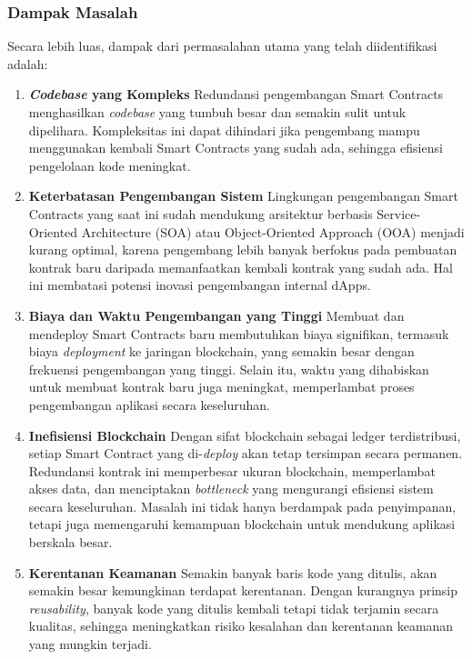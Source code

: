 \subsubsection{Dampak Masalah}
\label{subsubsec:dampak-masalah}

Secara lebih luas, dampak dari permasalahan utama yang telah diidentifikasi adalah:

\begin{enumerate}
	\item \textbf{\textit{Codebase} yang Kompleks} \newline
	      Redundansi pengembangan Smart Contracts menghasilkan \textit{codebase} yang tumbuh besar dan semakin sulit untuk dipelihara. Kompleksitas ini dapat dihindari jika pengembang mampu menggunakan kembali Smart Contracts yang sudah ada, sehingga efisiensi pengelolaan kode meningkat.
	\item \textbf{Keterbatasan Pengembangan Sistem} \newline
	      Lingkungan pengembangan Smart Contracts yang saat ini sudah mendukung arsitektur berbasis Service-Oriented Architecture (SOA) atau Object-Oriented Approach (OOA) menjadi kurang optimal, karena pengembang lebih banyak berfokus pada pembuatan kontrak baru daripada memanfaatkan kembali kontrak yang sudah ada. Hal ini membatasi potensi inovasi pengembangan internal dApps.
	\item \textbf{Biaya dan Waktu Pengembangan yang Tinggi} \newline
	      Membuat dan mendeploy Smart Contracts baru membutuhkan biaya signifikan, termasuk biaya \textit{deployment} ke jaringan blockchain, yang semakin besar dengan frekuensi pengembangan yang tinggi. Selain itu, waktu yang dihabiskan untuk membuat kontrak baru juga meningkat, memperlambat proses pengembangan aplikasi secara keseluruhan.
	\item \textbf{Inefisiensi Blockchain} \newline
	      Dengan sifat blockchain sebagai ledger terdistribusi, setiap Smart Contract yang di-\textit{deploy} akan tetap tersimpan secara permanen. Redundansi kontrak ini memperbesar ukuran blockchain, memperlambat akses data, dan menciptakan \textit{bottleneck} yang mengurangi efisiensi sistem secara keseluruhan. Masalah ini tidak hanya berdampak pada penyimpanan, tetapi juga memengaruhi kemampuan blockchain untuk mendukung aplikasi berskala besar.
	\item \textbf{Kerentanan Keamanan} \newline
	      Semakin banyak baris kode yang ditulis, akan semakin besar kemungkinan terdapat kerentanan. Dengan kurangnya prinsip \textit{reusability}, banyak kode yang ditulis kembali tetapi tidak terjamin secara kualitas, sehingga meningkatkan risiko kesalahan dan kerentanan keamanan yang mungkin terjadi.
\end{enumerate}